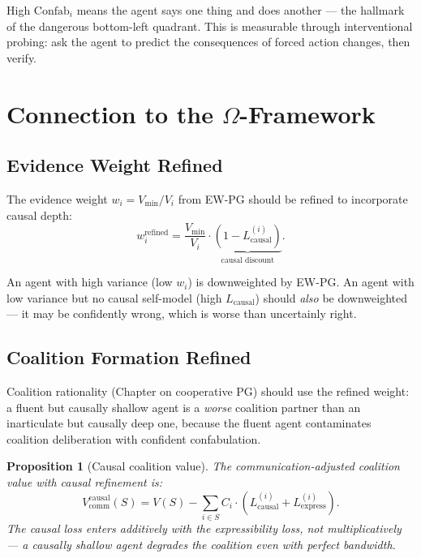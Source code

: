 \documentclass[11pt,a4paper]{article}
\newtheorem{proposition}[theorem]{Proposition}
\begin{document}
High $\text{Confab}_i$ means the agent says one thing and does another
--- the hallmark of the dangerous bottom-left quadrant. This is
measurable through interventional probing: ask the agent to predict
the consequences of forced action changes, then verify.


\section{Connection to the $\Omega$-Framework}

\subsection{Evidence Weight Refined}

The evidence weight $w_i = V_{\min}/V_i$ from EW-PG should be
refined to incorporate causal depth:
\begin{equation}\label{eq:refined-weight}
    w_i^{\text{refined}} = \frac{V_{\min}}{V_i} \cdot
    \underbrace{(1 - L_{\text{causal}}^{(i)})}_{\text{causal discount}}.
\end{equation}

An agent with high variance (low $w_i$) is downweighted by EW-PG.
An agent with low variance but no causal self-model (high
$L_{\text{causal}}$) should \emph{also} be downweighted --- it may
be confidently wrong, which is worse than uncertainly right.

\subsection{Coalition Formation Refined}

Coalition rationality (Chapter on cooperative PG) should use the
refined weight: a fluent but causally shallow agent is a \emph{worse}
coalition partner than an inarticulate but causally deep one, because
the fluent agent contaminates coalition deliberation with confident
confabulation.

\begin{proposition}[Causal coalition value]
The communication-adjusted coalition value with causal refinement is:
\begin{equation}
    V_{\text{comm}}^{\text{causal}}(S) = V(S) -
    \sum_{i \in S} C_i \cdot (L_{\text{causal}}^{(i)} + L_{\text{express}}^{(i)}).
\end{equation}
The causal loss enters \emph{additively} with the expressibility loss,
not multiplicatively --- a causally shallow agent degrades the coalition
even with perfect bandwidth.
\end{proposition}
\end{document}
